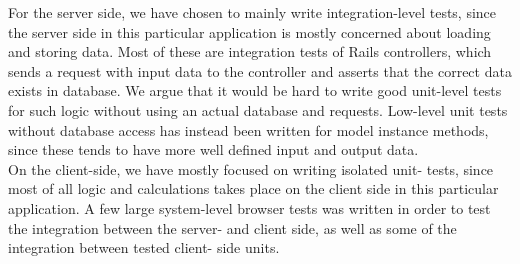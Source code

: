 
For the server side, we have chosen to mainly write integration-level
tests, since the server side in this particular application is mostly
concerned about loading and storing data. Most of these are integration
tests of Rails controllers, which sends a request with input data to the
controller and asserts that the correct data exists in database. We
argue that it would be hard to write good unit-level tests for such
logic without using an actual database and requests. Low-level unit
tests without database access has instead been written for model
instance methods, since these tends to have more well defined input and
output data.\\

On the client-side, we have mostly focused on writing isolated unit-
tests, since most of all logic and calculations takes place on the
client side in this particular application. A few large system-level
browser tests was written in order to test the integration between the
server- and client side, as well as some of the integration between
tested client- side units.\\
